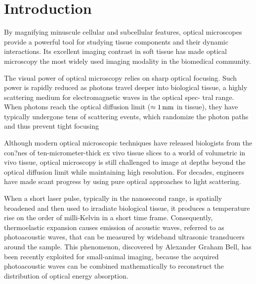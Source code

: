 \section{Introduction}
\label{sec:Introduction}

By magnifying minuscule cellular and subcellular features, optical microscopes provide a powerful tool for studying tissue components and their dynamic interactions. Its excellent imaging contrast in soft tissue has made optical microscopy the most widely used imaging modality in the biomedical community.\cite{2000_Amos_Lessonsfromhistory}  

The visual power of optical microscopy relies on sharp optical focusing. Such power is rapidly reduced as photons travel deeper into biological tissue, a highly scattering medium for electromagnetic waves in the optical spec- tral range. When photons reach the optical diffusion limit ($\approx \unit[1]{mm}$ in tissue), they have typically undergone tens of scattering events, which randomize the photon paths and thus prevent tight focusing~\cite{2000_Fujimoto_Opticalcoherencetomography:}

Although modern optical microscopic techniques have released biologists from the con?nes of ten-micrometer-thick ex vivo tissue slices to a world of volumetric in vivo tissue, optical microscopy is still challenged to image at depths beyond the optical diffusion limit while maintaining high resolution. For decades, engineers have made scant progress by using pure optical approaches to light scattering. 

When a short laser pulse, typically in the nanosecond range, is spatially broadened and then used to irradiate biological tissue, it produces a temperature rise on the order of milli-Kelvin in a short time frame. Consequently, thermoelastic expansion causes emission of acoustic waves, referred to as photoacoustic waves, that can be measured by wideband ultrasonic transducers around the sample. This phenomenon, discovered by Alexander Graham Bell, has been recently exploited for small-animal imaging, because the acquired photoacoustic waves can be combined mathematically to reconstruct the distribution of optical energy absorption. \cite{2005_Ntziachristos_Lookingandlistening}
 
